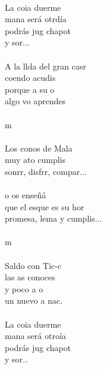\begin{cancion}%
	 \\
	La coia duerme \\
	mana será otrdía\\
	podrás jug chapot \\
	y sor... \\
\jump\\
	A la llda del gran casr\\
	coendo acudis \\
	porque a su o\\
	algo vo aprendes \\
\jump\\
	 m \\
\jump\\
	Los conos de Mala\\
	muy ato cumplis \\
	sonrr, disfrr, compar...\\
\jump\\
	o os enseñá\\
	que el esque es su hor\\
	promesa, lema y  cumplis... \\
\jump\\
	 m \\
\jump\\
	Saldo con Tic-c\\
	las as conoces  \\
	y poco a o\\
	un nuevo a nac. \\
\jump\\
	La coia duerme \\
	mana será otroía\\
	podrás jug chapot\\
	y sor..   \\
\end{cancion}%
